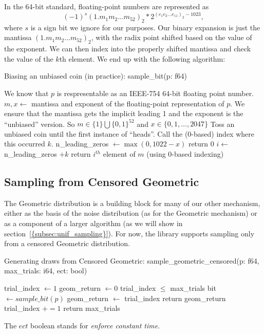 \documentclass[11pt]{scrartcl} %
\begin{document}
In the 64-bit standard, floating-point numbers are represented as
\[ (-1)^s(1.m_1m_2 \hdots m_{52})_2 * 2^{(e_{1}e_2 \hdots e_{11})_2 - 1023}, \]
where $s$ is a sign bit we ignore for our purposes.
Our binary expansion is just the mantissa $(1.m_1m_2 \hdots m_{52})_2$, with
the radix point shifted based on the value of the exponent.
We can then index into the properly shifted mantissa and check the value of the $k$th element.
We end up with the following algorithm:
\begin{algorithm}[H]
	\caption{Biasing an unbiased coin (in practice): \newline sample\_bit(p: f64)}
	\label{alg:biasing_a_coin_practice}
	\begin{algorithmic}[1]
		\State We know that $p$ is respresentable as an IEEE-754 64-bit floating point number.
		\State $m, x \gets $ mantissa and exponent of the floating-point representation of $p$. 
		We ensure that the mantissa gets the implicit leading 1 and the exponent is the ``unbiased'' version.
		So $m \in \{1\} \bigcup \{0, 1\}^{52}$ and $x \in \{0, 1, \hdots, 2047\}$
		\State Toss an unbiased coin until the first instance of ``heads''. Call the (0-based) index where this occurred $k$.
		\State n\_leading\_zeros $\gets \max(0, 1022 - x)$
			\State return 0
		\Else
			\State $i \gets$ n\_leading\_zeros $+ k$
			\State return $i^{th}$ element of $m$ (using 0-based indexing)
		\EndIf
	\end{algorithmic}
\end{algorithm}

\subsection{Sampling from Censored Geometric}
The Geometric distribution is a building block for many of our other mechanism, either as the basis of the 
noise distribution (as for the Geometric mechanism) or as a component of a larger algorithm (as we will show in 
section~\ref{{subsec:unif_sampling}}). For now, the library supports sampling only from a censored Geometric distribution. 
\begin{algorithm}[H]
	\caption{Generating draws from Censored Geometric: \newline sample\_geometric\_censored(p: f64, max\_trials: i64, ect: bool)}
	\label{alg:censored_geom_p}
	\begin{algorithmic}[1]
		\State trial\_index $\gets 1$
		\State geom\_return $\gets 0$
		\While trial\_index $\leq$ max\_trials
			\State bit $\gets sample\_bit(p)$
				 
					\State geom\_return $\gets$ trial\_index
						\State return geom\_return
					\EndIf
				\EndIf
			\Else
				\State trial\_index $+= 1$
			\EndIf
		\EndWhile
		 
			\State return max\_trials 
		\EndIf
	\end{algorithmic}
\end{algorithm}
The $ect$ boolean stands for \emph{enforce constant time}. 
\end{document}
